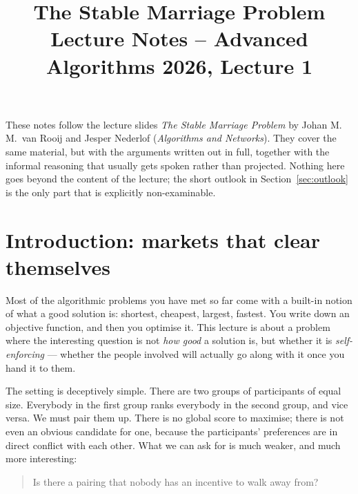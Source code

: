 \documentclass[11pt,a4paper]{article}
\title{\bfseries The Stable Marriage Problem\\[0.4em]
       \large Lecture Notes -- Advanced Algorithms 2026, Lecture 1}
\author{}
\date{}
\theoremstyle{plain}
\theoremstyle{definition}
\theoremstyle{remark}
\begin{document}
\maketitle
\vspace{-3.5em}

\begin{center}
\begin{minipage}{0.86\textwidth}
\small
These notes follow the lecture slides \emph{The Stable Marriage Problem}
by Johan M.\,M.\ van Rooij and Jesper Nederlof (\emph{Algorithms and
Networks}). They cover the same material, but with the arguments written out
in full, together with the informal reasoning that usually gets spoken rather
than projected. Nothing here goes beyond the content of the lecture; the short
outlook in Section~\ref{sec:outlook} is the only part that is explicitly
non-examinable.
\end{minipage}
\end{center}
\vspace{1em}

\tableofcontents
\bigskip

\section{Introduction: markets that clear themselves}

Most of the algorithmic problems you have met so far come with a built-in
notion of what a good solution is: shortest, cheapest, largest, fastest. You
write down an objective function, and then you optimise it. This lecture is
about a problem where the interesting question is not \emph{how good} a
solution is, but whether it is \emph{self-enforcing} --- whether the people
involved will actually go along with it once you hand it to them.

The setting is deceptively simple. There are two groups of participants of
equal size. Everybody in the first group ranks everybody in the second group,
and vice versa. We must pair them up. There is no global score to maximise;
there is not even an obvious candidate for one, because the participants'
preferences are in direct conflict with each other. What we can ask for is
much weaker, and much more interesting:

\begin{quote}
Is there a pairing that nobody has an incentive to walk away from?
\end{quote}
\end{document}
